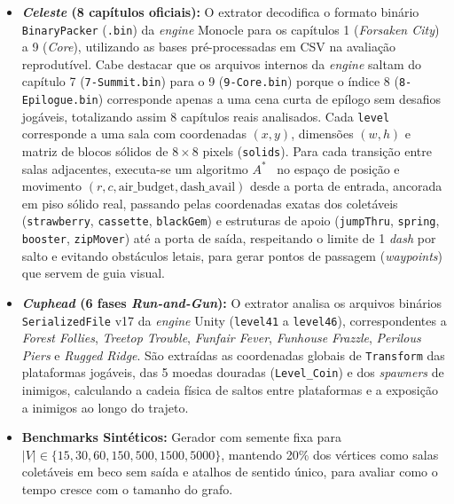 \documentclass[conference]{IEEEtran}
\begin{document}
\begin{itemize}
    \item \textbf{\textit{Celeste} (8 cap\'itulos oficiais):} O extrator decodifica o formato bin\'ario \texttt{BinaryPacker} (\texttt{.bin}) da \textit{engine} Monocle para os cap\'itulos 1 (\textit{Forsaken City}) a 9 (\textit{Core}), utilizando as bases pr\'e-processadas em CSV na avalia\c{c}\~ao reprodut\'ivel. Cabe destacar que os arquivos internos da \textit{engine} saltam do cap\'itulo 7 (\texttt{7-Summit.bin}) para o 9 (\texttt{9-Core.bin}) porque o \'indice 8 (\texttt{8-Epilogue.bin}) corresponde apenas a uma cena curta de ep\'ilogo sem desafios jog\'aveis, totalizando assim 8 cap\'itulos reais analisados. Cada \texttt{level} corresponde a uma sala com coordenadas $(x, y)$, dimens\~oes $(w, h)$ e matriz de blocos s\'olidos de $8\times 8$ pixels (\texttt{solids}). Para cada transi\c{c}\~ao entre salas adjacentes, executa-se um algoritmo $A^*$~\cite{hart1968,tremblay2014} no espa\c{c}o de posi\c{c}\~ao e movimento $(r, c, \text{air\_budget}, \text{dash\_avail})$ desde a porta de entrada, ancorada em piso s\'olido real, passando pelas coordenadas exatas dos colet\'aveis (\texttt{strawberry}, \texttt{cassette}, \texttt{blackGem}) e estruturas de apoio (\texttt{jumpThru}, \texttt{spring}, \texttt{booster}, \texttt{zipMover}) at\'e a porta de sa\'ida, respeitando o limite de 1 \textit{dash} por salto e evitando obst\'aculos letais, para gerar pontos de passagem (\textit{waypoints}) que servem de guia visual.
    \item \textbf{\textit{Cuphead} (6 fases \textit{Run-and-Gun}):} O extrator analisa os arquivos bin\'arios \texttt{SerializedFile} v17 da \textit{engine} Unity (\texttt{level41} a \texttt{level46}), correspondentes a \textit{Forest Follies}, \textit{Treetop Trouble}, \textit{Funfair Fever}, \textit{Funhouse Frazzle}, \textit{Perilous Piers} e \textit{Rugged Ridge}. S\~ao extra\'idas as coordenadas globais de \texttt{Transform} das plataformas jog\'aveis, das 5 moedas douradas (\texttt{Level\_Coin}) e dos \textit{spawners} de inimigos, calculando a cadeia f\'isica de saltos entre plataformas e a exposi\c{c}\~ao a inimigos ao longo do trajeto.
    \item \textbf{Benchmarks Sint\'eticos:} Gerador com semente fixa para $|V| \in \{15, 30, 60, 150, 500, 1500, 5000\}$, mantendo 20\% dos v\'ertices como salas colet\'aveis em beco sem sa\'ida e atalhos de sentido \'unico, para avaliar como o tempo cresce com o tamanho do grafo.
\end{itemize}
\end{document}
